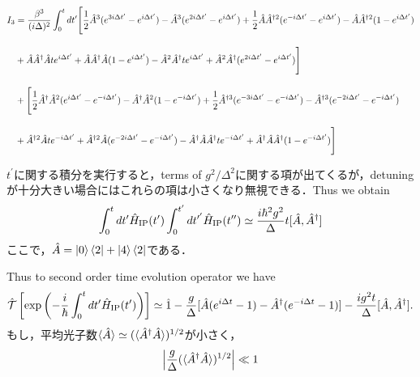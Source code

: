 \begin{align}
    I_3
    &=\frac{\beta^3}{(i\Delta)^2}\int_0^{t}dt^\prime
    \Biggl[
    \frac{1}{2}\hat{A}^3(e^{3i\Delta t^\prime}-e^{i\Delta t^{\prime}})
    -\hat{A}^3(e^{2i\Delta t^\prime}-e^{i\Delta t^{\prime}})
    +\frac{1}{2}\hat{A}\hat{A}^{\dagger2}(e^{-i\Delta t^\prime}-e^{i\Delta t^{\prime}})
    -\hat{A}\hat{A}^{\dagger2}(1-e^{i\Delta t^{\prime}})\nn[10pt]
    &
    +\hat{A}\hat{A}^{\dagger}\hat{A}t e^{i\Delta t^{\prime}}
    +\hat{A}\hat{A}^{\dagger}\hat{A}(1-e^{i\Delta t^{\prime}})
    -\hat{A}^2\hat{A}^{\dagger}t e^{i\Delta t^{\prime}}
    +\hat{A}^2\hat{A}^{\dagger}(e^{2i\Delta t^\prime}-e^{i\Delta t^{\prime}})
    \Biggr]\nn[10pt]
    &+
    \Biggl[
    \frac{1}{2}\hat{A}^\dagger\hat{A}^2(e^{i\Delta t^\prime}-e^{-i\Delta t^{\prime}})
    -\hat{A}^\dagger\hat{A}^2(1-e^{-i\Delta t^{\prime}})
    +\frac{1}{2}\hat{A}^{\dagger3}(e^{-3i\Delta t^\prime}-e^{-i\Delta t^{\prime}})
    -\hat{A}^{\dagger3}(e^{-2i\Delta t^\prime}-e^{-i\Delta t^{\prime}})\nn[10pt]
    &
    +\hat{A}^{\dagger2}\hat{A}t e^{-i\Delta t^{\prime}}
    +\hat{A}^{\dagger2}\hat{A}(e^{-2i\Delta t^\prime}-e^{-i\Delta t^{\prime}})
    -\hat{A}^\dagger\hat{A}\hat{A}^{\dagger}t e^{-i\Delta t^{\prime}}
    +\hat{A}^\dagger\hat{A}\hat{A}^{\dagger}(1-e^{-i\Delta t^{\prime}})
    \Biggr]
\end{align}


$t^\prime$に関する積分を実行すると，terms of $g^2/\Delta^2$に関する項が出てくるが，detuningが十分大きい場合にはこれらの項は小さくなり無視できる．Thus we obtain 
\begin{align}
    \int_0^{t}dt^\prime \hat{H}_{\rm{IP}}(t^\prime)
    \int_0^{t^\prime}dt^{\prime^\prime} \hat{H}_{\rm{IP}}(t^{\prime\prime})
    \simeq\frac{i\hbar^2g^2}{\Delta}t[\hat{A}, \hat{A}^\dagger]
\end{align}
ここで，$\hat{A}=\ket{0}\bra{2} + \ket{4}\bra{2}$である．


 Thus to second order time evolution operator we have
\begin{equation}
    \hat{\mathcal{T}}\left[
    \exp{\left(
    -\frac{i}{\hbar}\int_0^t dt^\prime \hat{H}_{\rm{IP}}(t^\prime)
    \right)}
    \right]
    \simeq
    \hat{1}-\frac{g}{\Delta}[\hat{A}(e^{i\Delta t}-1)-\hat{A}^\dagger(e^{-i\Delta t}-1)]
    -\frac{ig^2t}{\Delta}[\hat{A},\hat{A}^\dagger].
\end{equation}
もし，平均光子数$\braket{\hat{A}}\simeq(\braket{\hat{A}^\dag\hat{A}})^{1/2}$が小さく，
\begin{equation}
    \left|
    \frac{g}{\Delta}(\braket{\hat{A}^\dag\hat{A}})^{1/2}
    \right|\ll1
\end{equation}

